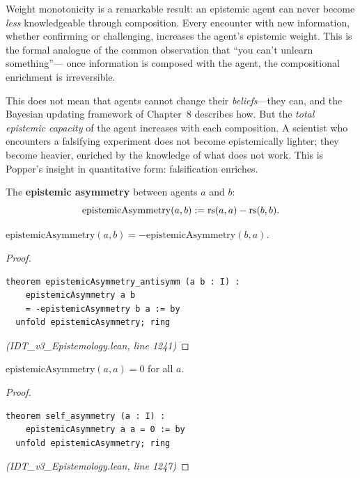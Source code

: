 \begin{interpretation}
Weight monotonicity is a remarkable result: an epistemic agent can never become
\emph{less} knowledgeable through composition. Every encounter with new information,
whether confirming or challenging, increases the agent's epistemic weight. This is
the formal analogue of the common observation that ``you can't unlearn something''---
once information is composed with the agent, the compositional enrichment is
irreversible.

This does not mean that agents cannot change their \emph{beliefs}---they can, and
the Bayesian updating framework of Chapter~8 describes how. But the \emph{total
epistemic capacity} of the agent increases with each composition. A scientist who
encounters a falsifying experiment does not become epistemically lighter; they
become heavier, enriched by the knowledge of what does not work. This is Popper's
insight in quantitative form: falsification enriches.
\end{interpretation}

\begin{definition}
\label{def:epistemic-asymmetry}
The \textbf{epistemic asymmetry} between agents $a$ and $b$:
\[
  \mathrm{epistemicAsymmetry}(a, b) := \mathrm{rs}(a, a) - \mathrm{rs}(b, b).
\]
\end{definition}

\begin{theorem}
\label{thm:asymmetry-antisymm}
$\mathrm{epistemicAsymmetry}(a, b) = -\mathrm{epistemicAsymmetry}(b, a)$.
\end{theorem}

\begin{proof}
\begin{lstlisting}
theorem epistemicAsymmetry_antisymm (a b : I) :
    epistemicAsymmetry a b
    = -epistemicAsymmetry b a := by
  unfold epistemicAsymmetry; ring
\end{lstlisting}
\textit{(IDT\_v3\_Epistemology.lean, line 1241)}
\end{proof}

\begin{theorem}
\label{thm:self-asymmetry}
$\mathrm{epistemicAsymmetry}(a, a) = 0$ for all $a$.
\end{theorem}

\begin{proof}
\begin{lstlisting}
theorem self_asymmetry (a : I) :
    epistemicAsymmetry a a = 0 := by
  unfold epistemicAsymmetry; ring
\end{lstlisting}
\textit{(IDT\_v3\_Epistemology.lean, line 1247)}
\end{proof}

